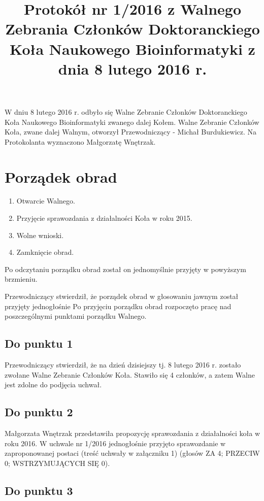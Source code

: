 \documentclass{article}
\title{Protokół nr 1/2016 z Walnego Zebrania Członków Doktoranckiego Koła Naukowego Bioinformatyki z dnia 8 lutego 2016 r.}
\date{}
\begin{document}
\maketitle

W dniu 8 lutego 2016 r. odbyło się Walne Zebranie Członków Doktoranckiego Koła Naukowego Bioinformatyki zwanego dalej Kołem.
Walne Zebranie Członków Koła, zwane dalej Walnym, otworzył Przewodniczący - Michał Burdukiewicz. Na Protokolanta wyznaczono Małgorzatę Wnętrzak. 


\section{Porządek obrad}
  \begin{enumerate}
    \item Otwarcie Walnego.
    \item Przyjęcie sprawozdania z działalności Koła w roku 2015.
    \item Wolne wnioski.
    \item Zamknięcie obrad.
  \end{enumerate}

Po odczytaniu porządku obrad został on jednomyślnie przyjęty w powyższym brzmieniu.

Przewodniczący stwierdził, że porządek obrad w głosowaniu jawnym został przyjęty jednogłośnie
Po przyjęciu porządku obrad rozpoczęto pracę nad poszczególnymi punktami porządku Walnego.

\subsection{Do punktu 1}
Przewodniczący stwierdził, że na dzień dzisiejszy tj. 8 lutego 2016 r. zostało zwołane Walne
Zebranie Członków Koła. Stawiło się 4 członków, a zatem Walne jest zdolne do podjęcia uchwał.

\pagebreak

\subsection{Do punktu 2}
Małgorzata Wnętrzak przedstawiła propozycję sprawozdania z działalności koła w roku 2016. W uchwale nr 1/2016 jednogłośnie przyjęto sprawozdanie w zaproponowanej postaci (treść uchwały w załączniku 1) (głosów ZA 4; PRZECIW 0; WSTRZYMUJĄCYCH SIĘ 0).

\subsection{Do punktu 3}
\end{document}
